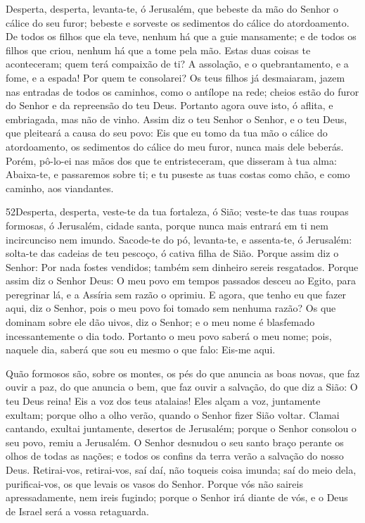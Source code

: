 Desperta, desperta, levanta-te, ó Jerusalém, que bebeste da mão
do Senhor o cálice do seu furor; bebeste e sorveste os sedimentos do
cálice do atordoamento. De todos os filhos que ela teve,
nenhum há que a guie mansamente; e de todos os filhos que criou,
nenhum há que a tome pela mão. Estas duas coisas te
aconteceram; quem terá compaixão de ti? A assolação, e o
quebrantamento, e a fome, e a espada! Por quem te consolarei?
Os teus filhos já desmaiaram, jazem nas entradas de todos os
caminhos, como o antílope na rede; cheios estão do furor do Senhor e
da repreensão do teu Deus. Portanto agora ouve isto, ó
aflita, e embriagada, mas não de vinho. Assim diz o teu
Senhor o Senhor, e o teu Deus, que pleiteará a causa do seu povo:
Eis que eu tomo da tua mão o cálice do atordoamento, os sedimentos
do cálice do meu furor, nunca mais dele beberás. Porém,
pô-lo-ei nas mãos dos que te entristeceram, que disseram à tua alma:
Abaixa-te, e passaremos sobre ti; e tu puseste as tuas costas como
chão, e como caminho, aos viandantes.

\medskip

\lettrine{52}{}Desperta, desperta, veste-te da tua fortaleza, ó
Sião; veste-te das tuas roupas formosas, ó Jerusalém, cidade santa,
porque nunca mais entrará em ti nem incircunciso nem imundo.
Sacode-te do pó, levanta-te, e assenta-te, ó Jerusalém: solta-te
das cadeias de teu pescoço, ó cativa filha de Sião. Porque assim
diz o Senhor: Por nada fostes vendidos; também sem dinheiro sereis
resgatados. Porque assim diz o Senhor Deus: O meu povo em tempos
passados desceu ao Egito, para peregrinar lá, e a Assíria sem razão
o oprimiu. E agora, que tenho eu que fazer aqui, diz o Senhor,
pois o meu povo foi tomado sem nenhuma razão? Os que dominam sobre
ele dão uivos, diz o Senhor; e o meu nome é blasfemado
incessantemente o dia todo. Portanto o meu povo saberá o meu
nome; pois, naquele dia, saberá que sou eu mesmo o que falo: Eis-me
aqui.

Quão formosos são, sobre os montes, os pés do que anuncia as boas
novas, que faz ouvir a paz, do que anuncia o bem, que faz ouvir a
salvação, do que diz a Sião: O teu Deus reina! Eis a voz dos
teus atalaias! Eles alçam a voz, juntamente exultam; porque olho a
olho verão, quando o Senhor fizer Sião voltar. Clamai cantando,
exultai juntamente, desertos de Jerusalém; porque o Senhor consolou
o seu povo, remiu a Jerusalém. O Senhor desnudou o seu santo
braço perante os olhos de todas as nações; e todos os confins da
terra verão a salvação do nosso Deus. Retirai-vos,
retirai-vos, saí daí, não toqueis coisa imunda; saí do meio dela,
purificai-vos, os que levais os vasos do Senhor. Porque vós
não saireis apressadamente, nem ireis fugindo; porque o Senhor irá
diante de vós, e o Deus de Israel será a vossa retaguarda.

